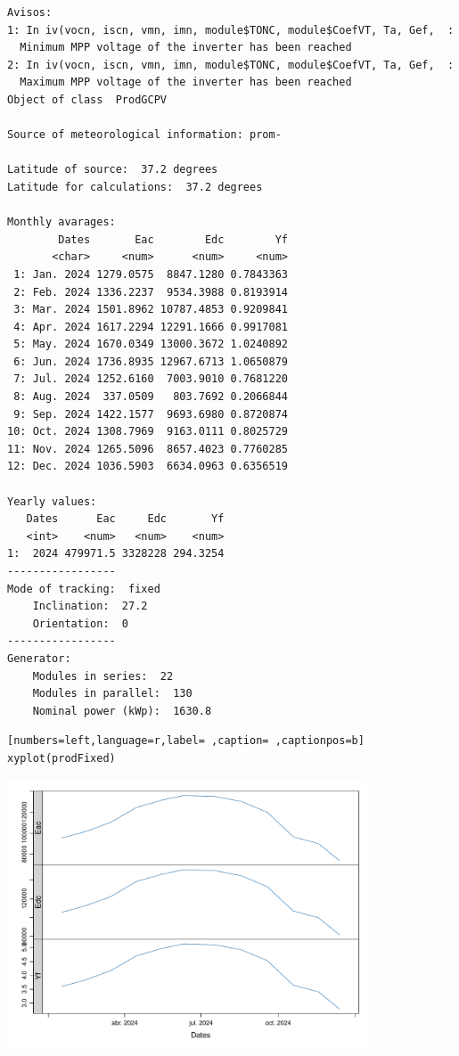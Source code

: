 \begin{verbatim}
Avisos:
1: In iv(vocn, iscn, vmn, imn, module$TONC, module$CoefVT, Ta, Gef,  :
  Minimum MPP voltage of the inverter has been reached
2: In iv(vocn, iscn, vmn, imn, module$TONC, module$CoefVT, Ta, Gef,  :
  Maximum MPP voltage of the inverter has been reached
Object of class  ProdGCPV 

Source of meteorological information: prom- 

Latitude of source:  37.2 degrees
Latitude for calculations:  37.2 degrees

Monthly avarages:
        Dates       Eac        Edc        Yf
       <char>     <num>      <num>     <num>
 1: Jan. 2024 1279.0575  8847.1280 0.7843363
 2: Feb. 2024 1336.2237  9534.3988 0.8193914
 3: Mar. 2024 1501.8962 10787.4853 0.9209841
 4: Apr. 2024 1617.2294 12291.1666 0.9917081
 5: May. 2024 1670.0349 13000.3672 1.0240892
 6: Jun. 2024 1736.8935 12967.6713 1.0650879
 7: Jul. 2024 1252.6160  7003.9010 0.7681220
 8: Aug. 2024  337.0509   803.7692 0.2066844
 9: Sep. 2024 1422.1577  9693.6980 0.8720874
10: Oct. 2024 1308.7969  9163.0111 0.8025729
11: Nov. 2024 1265.5096  8657.4023 0.7760285
12: Dec. 2024 1036.5903  6634.0963 0.6356519

Yearly values:
   Dates      Eac     Edc       Yf
   <int>    <num>   <num>    <num>
1:  2024 479971.5 3328228 294.3254
-----------------
Mode of tracking:  fixed 
    Inclination:  27.2 
    Orientation:  0 
-----------------
Generator:
    Modules in series:  22 
    Modules in parallel:  130 
    Nominal power (kWp):  1630.8
\end{verbatim}

\begin{lstlisting}[numbers=left,language=r,label= ,caption= ,captionpos=b]
xyplot(prodFixed)
\end{lstlisting}

\begin{center}
\includegraphics[width=0.8\textwidth]{figuras/codigo-prodgcpv.pdf}
\end{center}

